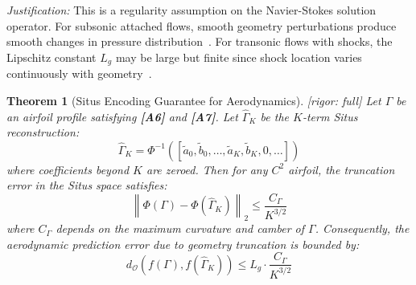 \documentclass[11pt,a4paper]{article}
\newtheorem{theorem}{Theorem}[section]
\theoremstyle{definition}
\theoremstyle{remark}
\newcommand{\rigorFull}{\textcolor{green!60!black}{[rigor: full]}}
\newcommand{\assumptionTag}[1]{\textsf{\textbf{[A#1]}}}
\newcommand{\norm}[1]{\left\lVert#1\right\rVert}
\begin{document}
\textit{Justification:} This is a regularity assumption on the Navier-Stokes solution operator. For subsonic attached flows, smooth geometry perturbations produce smooth changes in pressure distribution~\citep{jameson1988aerodynamic}. For transonic flows with shocks, the Lipschitz constant $L_g$ may be large but finite since shock location varies continuously with geometry~\citep{anderson2017fundamentals}.

\begin{theorem}[Situs Encoding Guarantee for Aerodynamics] \label{thm:situs}
\rigorFull
Let $\Gamma$ be an airfoil profile satisfying \assumptionTag{6} and \assumptionTag{7}.
Let $\hat{\Gamma}_K$ be the $K$-term Situs reconstruction:
\begin{equation}
\hat{\Gamma}_K = \Phi^{-1}\left( [\tilde{a}_0, \tilde{b}_0, \dots, \tilde{a}_K, \tilde{b}_K, 0, \dots] \right)
\label{eq:reconstruction}
\end{equation}
where coefficients beyond $K$ are zeroed.
Then for any $C^2$ airfoil, the truncation error in the Situs space satisfies:
\begin{equation}
\norm{\Phi(\Gamma) - \Phi(\hat{\Gamma}_K)}_2 \leq \frac{C_\Gamma}{K^{3/2}}
\label{eq:truncation}
\end{equation}
where $C_\Gamma$ depends on the maximum curvature and camber of $\Gamma$.
Consequently, the aerodynamic prediction error due to geometry truncation is bounded by:
\begin{equation}
d_{\mathcal{O}}(f(\Gamma), f(\hat{\Gamma}_K)) \leq L_g \cdot \frac{C_\Gamma}{K^{3/2}}
\label{eq:aero_bound}
\end{equation}
\end{theorem}
\end{document}
